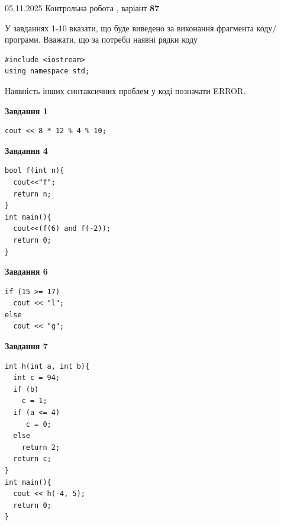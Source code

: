 \documentclass[12pt, ukrainian]{article}
\begin{document}
{\Large{05.11.2025 Контрольна робота , варіант  \No \textbf { 87 }\par}}
{
\begin {large}
У завданнях 1-10 вказати, що буде виведено за виконання фрагмента коду/про\-гра\-ми.
Вважати, що за потреби наявні рядки коду
\begin{verbatim}
#include <iostream>
using namespace std;
\end{verbatim}
Наявність інших синтаксичних проблем у коді позначати ERROR.

\begin{minipage}[t]{7.0cm}

\begin{center}
\textbf{Завдання 1}
\end{center}
\vspace{-8mm}

\begin{verbatim}
cout << 8 * 12 % 4 % 10;
\end{verbatim}



\begin{center}
\textbf{Завдання 4}
\end{center}
\vspace{-8mm}

\begin{verbatim}
bool f(int n){
  cout<<"f";
  return n;
}
int main(){
  cout<<(f(6) and f(-2));
  return 0;
}
\end{verbatim}



\begin{center}
\textbf{Завдання 6}
\end{center}
\vspace{-8mm}

\begin{verbatim}
if (15 >= 17)
  cout << "l";
else
  cout << "g";
\end{verbatim}



\begin{center}
\textbf{Завдання 7}
\end{center}
\vspace{-8mm}

\begin{verbatim}
int h(int a, int b){
  int c = 94;
  if (b)
    c = 1;
  if (a <= 4)
     c = 0;
  else
    return 2;
  return c;
}
int main(){
  cout << h(-4, 5);
  return 0;
}
\end{verbatim}


\end{minipage}
\end{large}}
\end{document}

